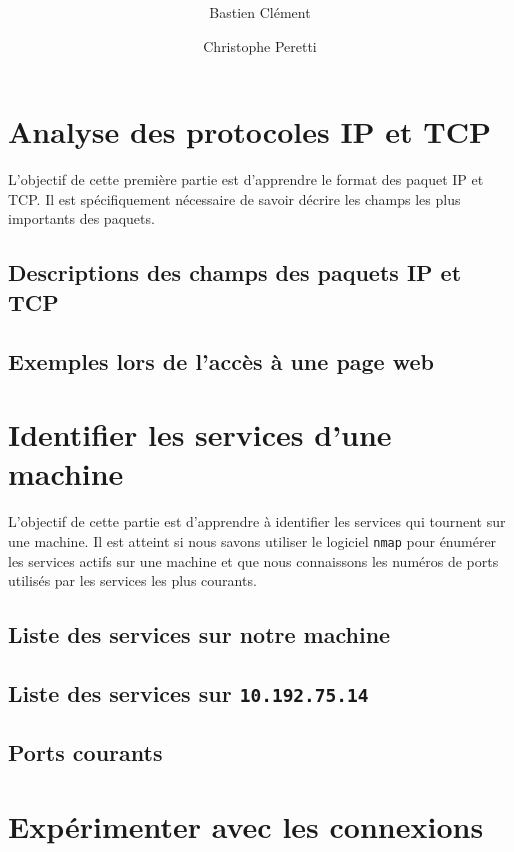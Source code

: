 \documentclass[11pt,a4paper]{article}
\author{Bastien Clément \and Christophe Peretti}
\title{{\normalsize \doccourse} \\ \doctitle }
\begin{document}
\maketitle
\vspace{1em}

\section{Analyse des protocoles IP et TCP}

L'objectif de cette première partie est d'apprendre le format des paquet IP et TCP. Il est spécifiquement nécessaire de savoir décrire les champs les plus importants des paquets.

\subsection{Descriptions des champs des paquets IP et TCP}
\subsection{Exemples lors de l'accès à une page web}

\section{Identifier les services d'une machine}

L'objectif de cette partie est d'apprendre à identifier les services qui tournent sur une machine. Il est atteint si nous savons utiliser le logiciel \texttt{nmap} pour énumérer les services actifs sur une machine et que nous connaissons les numéros de ports utilisés par les services les plus courants.

\subsection{Liste des services sur notre machine}
\subsection{Liste des services sur \texttt{10.192.75.14}}
\subsection{Ports courants}

\section{Expérimenter avec les connexions}
\end{document}
